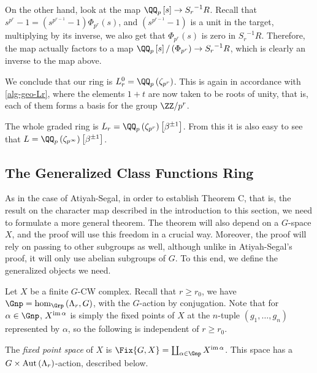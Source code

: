 \begin{example}
	On the other hand, look at the map $\QQ_p\left[s\right] \to {S_r}^{-1} R$.
	Recall that $s^{p^r} - 1 = \left(s^{p^{r-1}} - 1\right) \Phi_{p^r}\left(s\right)$, and $\left(s^{p^{r-1}} - 1\right)$ is a unit in the target, multiplying by its inverse, we also get that $\Phi_{p^r}\left(s\right)$ is zero in ${S_r}^{-1} R$.
	Therefore, the map actually factors to a map $\QQ_p\left[s\right]/\left(\Phi_{p^r}\right) \to {S_r}^{-1} R$, which is clearly an inverse to the map above.
	
	We conclude that our ring is $L_r^0 = \QQ_p\left(\zeta_{p^r}\right)$.
	This is again in accordance with \ref{alg-geo-Lr}, where the elements $1+t$ are now taken to be roots of unity, that is, each of them forms a basis for the group $\ZZ/p^r$.
	
	The whole graded ring is $L_r = \QQ_p\left(\zeta_{p^r}\right)\left[\beta^{\pm 1}\right]$.
	From this it is also easy to see that $L = \QQ_p\left(\zeta_{p^\infty}\right)\left[\beta^{\pm 1}\right]$.
\end{example}



\subsection{The Generalized Class Functions Ring}

As in the case of Atiyah-Segal, in order to establish Theorem C, that is, the result on the character map described in the introduction to this section, we need to formulate a more general theorem.
The theorem will also depend on a $G$-space $X$, and the proof will use this freedom in a crucial way.
Moreover, the proof will rely on passing to other subgroups as well, although unlike in Atiyah-Segal's proof, it will only use abelian subgroups of $G$.
To this end, we define the generalized objects we need.

Let $X$ be a finite $G$-CW complex.
Recall that $r \geq r_0$, we have $\Gnp = \hom_{\Grp}\left(\Lambda_r, G\right)$, with the $G$-action by conjugation.
Note that for $\alpha \in \Gnp$, $X^{\operatorname{im} \alpha}$ is simply the fixed points of $X$ at the $n$-tuple $\left(g_1, \dotsc, g_n\right)$ represented by $\alpha$, so the following is independent of $r \geq r_0$.

\begin{definition}
	The \emph{fixed point space} of $X$ is $\Fix{G,X} = \coprod_{\alpha \in \Gnp} X^{\im \alpha}$.
	This space has a $G \times \operatorname{Aut} \left(\Lambda_r\right)$-action, described below.
\end{definition}


